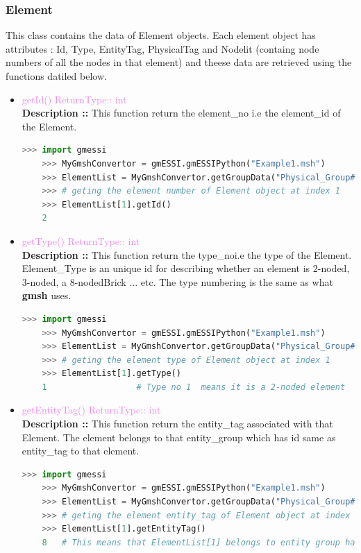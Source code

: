 \documentclass[11pt]{article}
\begin{document}
\subsubsection{Element}
This class contains the data of Element objects. Each element object has attributes : Id, Type, EntityTag, PhysicalTag and Nodelit (containg node numbers of all the nodes in that element) and theese data are retrieved using the functions datiled below. 

\begin{itemize}

    \item \textcolor{violet}{getId() \hfill {ReturnType:: int}} \\
    \textbf{Description ::} This function return the element\_no i.e the element_id of the Element. 
    \begin{lstlisting}[language=Python]
    >>> import gmessi
    >>> MyGmshConvertor = gmESSI.gmESSIPython("Example1.msh")
    >>> ElementList = MyGmshConvertor.getGroupData("Physical_Group#ApplyForce").ElementList
    >>> # geting the element number of Element object at index 1    
    >>> ElementList[1].getId()
    2
    \end{lstlisting} 

    \item \textcolor{violet}{getType() \hfill {ReturnType:: int}} \\
    \textbf{Description ::} This function return the type\_noi.e the type of the Element. Element\_Type is an unique id for describing whether an element is 2-noded, 3-noded, a 8-nodedBrick ... etc. The type numbering is the same as what \textbf{gmsh} uses.
    \begin{lstlisting}[language=Python]
    >>> import gmessi
    >>> MyGmshConvertor = gmESSI.gmESSIPython("Example1.msh")
    >>> ElementList = MyGmshConvertor.getGroupData("Physical_Group#ApplyForce").ElementList
    >>> # geting the element type of Element object at index 1    
    >>> ElementList[1].getType()
    1                  # Type no 1  means it is a 2-noded element
    \end{lstlisting} 

    \item \textcolor{violet}{getEntityTag() \hfill {ReturnType:: int}} \\
    \textbf{Description ::} This function return the entity\_tag associated with that Element. The element belongs to that entity\_group which has id same as entity\_tag to that element.  
    \begin{lstlisting}[language=Python]
    >>> import gmessi
    >>> MyGmshConvertor = gmESSI.gmESSIPython("Example1.msh")
    >>> ElementList = MyGmshConvertor.getGroupData("Physical_Group#ApplyForce").ElementList
    >>> # geting the element entity_tag of Element object at index 1    
    >>> ElementList[1].getEntityTag()
    8   # This means that ElementList[1] belongs to entity group having id 8                      
    \end{lstlisting} 


\end{itemize}
\end{document}
